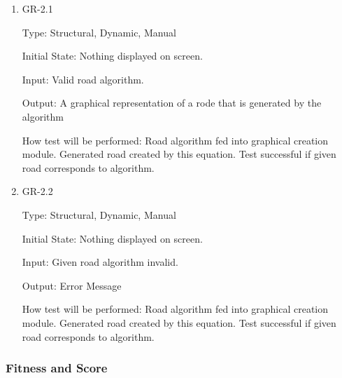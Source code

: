 \documentclass[12pt, titlepage]{article}
\begin{document}
\begin{enumerate}
\item{GR-2.1\\}

Type: Structural, Dynamic, Manual
					
Initial State: Nothing displayed on screen.
					
Input:  Valid road algorithm.
					
Output: A graphical representation of a rode that is generated by the algorithm
					
How test will be performed: Road algorithm fed into graphical creation module. Generated road created by this equation. Test successful if given road corresponds to algorithm.

\item{GR-2.2\\}

Type: Structural, Dynamic, Manual
					
Initial State: Nothing displayed on screen.
					
Input: Given road algorithm invalid.
					
Output: Error Message
					
How test will be performed: Road algorithm fed into graphical creation module. Generated road created by this equation. Test successful if given road corresponds to algorithm.

\end{enumerate}

\subsubsection{Fitness and Score}
\end{document}
